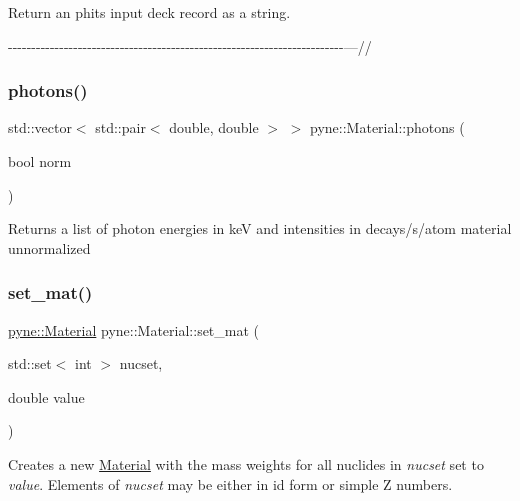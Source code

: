 Return an phits input deck record as a string. 

-\/-\/-\/-\/-\/-\/-\/-\/-\/-\/-\/-\/-\/-\/-\/-\/-\/-\/-\/-\/-\/-\/-\/-\/-\/-\/-\/-\/-\/-\/-\/-\/-\/-\/-\/-\/-\/-\/-\/-\/-\/-\/-\/-\/-\/-\/-\/-\/-\/-\/-\/-\/-\/-\/-\/-\/-\/-\/-\/-\/-\/-\/-\/-\/-\/-\/-\/-\/-\/-\/-\/-\/---// \mbox{\label{classpyne_1_1_material_a3630f6f54a7ff6355da0b76b4d0e35a1}} 
\subsubsection{\texorpdfstring{photons()}{photons()}}
{\footnotesize\ttfamily std\+::vector$<$ std\+::pair$<$ double, double $>$ $>$ pyne\+::\+Material\+::photons (\begin{DoxyParamCaption}\item[{bool}]{norm }\end{DoxyParamCaption})}

Returns a list of photon energies in keV and intensities in decays/s/atom material unnormalized \mbox{\label{classpyne_1_1_material_a17530f493ed5ba0d7f6e9e46c3a49744}} 
\subsubsection{\texorpdfstring{set\+\_\+mat()}{set\_mat()}\hspace{0.1cm}{\footnotesize\ttfamily [1/2]}}
{\footnotesize\ttfamily \hyperlink{classpyne_1_1_material}{pyne\+::\+Material} pyne\+::\+Material\+::set\+\_\+mat (\begin{DoxyParamCaption}\item[{std\+::set$<$ int $>$}]{nucset,  }\item[{double}]{value }\end{DoxyParamCaption})}

Creates a new \hyperlink{classpyne_1_1_material}{Material} with the mass weights for all nuclides in {\itshape nucset} set to {\itshape value}. Elements of {\itshape nucset} may be either in id form or simple Z numbers. \mbox{\label{classpyne_1_1_material_a878002d7dfce0dd5a2ed518c6afc6b10}} 
